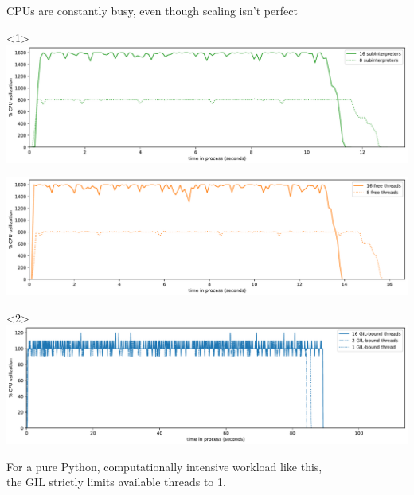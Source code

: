 \documentclass[aspectratio=169]{beamer}
\begin{document}
\begin{frame}{CPUs are constantly busy, even though scaling isn't perfect}
\Large
\vspace{0.25 cm}
\begin{center}
\begin{onlyenv}<1>
\includegraphics[width=0.93\linewidth]{img/cpu-of-compute-subinterpreters.pdf}

\includegraphics[width=0.93\linewidth]{img/cpu-of-compute-free-threads.pdf}
\end{onlyenv}\begin{onlyenv}<2>
\includegraphics[width=0.93\linewidth]{img/cpu-of-compute-gil-threads.pdf}

For a pure Python, computationally intensive workload like this, \\ the GIL strictly limits available threads to 1.
\end{onlyenv}
\end{center}
\end{frame}
\end{document}
